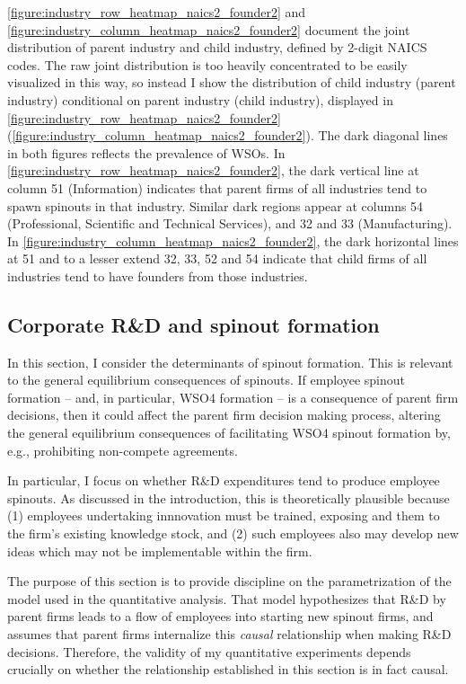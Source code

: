 \documentclass[11pt,english]{article}
\begin{document}
\autoref{figure:industry_row_heatmap_naics2_founder2} and \autoref{figure:industry_column_heatmap_naics2_founder2} document the joint distribution of parent industry and child industry, defined by 2-digit NAICS codes. The raw joint distribution is too heavily concentrated to be easily visualized in this way, so instead I show the distribution of child industry (parent industry) conditional on parent industry (child industry), displayed in \autoref{figure:industry_row_heatmap_naics2_founder2} (\autoref{figure:industry_column_heatmap_naics2_founder2}). The dark diagonal lines in both figures reflects the prevalence of WSOs. In \autoref{figure:industry_row_heatmap_naics2_founder2}, the dark vertical line at column 51 (Information) indicates that parent firms of all industries tend to spawn spinouts in that industry. Similar dark regions appear at columns 54 (Professional, Scientific and Technical Services), and 32 and 33 (Manufacturing). In \autoref{figure:industry_column_heatmap_naics2_founder2}, the dark horizontal lines at 51 and to a lesser extend 32, 33, 52 and 54 indicate that child firms of all industries tend to have founders from those industries.

\subsection{Corporate R\&D and spinout formation}\label{subsec:empirics:corpRDandspinouts}

In this section, I consider the determinants of spinout formation. This is relevant to the general equilibrium consequences of spinouts. If employee spinout formation -- and, in particular, WSO4 formation -- is a consequence of parent firm decisions, then it could affect the parent firm decision making process, altering the general equilibrium consequences of facilitating WSO4 spinout formation by, e.g., prohibiting non-compete agreements. 

In particular, I focus on whether R\&D expenditures tend to produce employee spinouts. As discussed in the introduction, this is theoretically plausible because (1) employees undertaking innnovation must be trained, exposing and them to the firm's existing knowledge stock, and (2) such employees also may develop new ideas which may not be implementable within the firm.  

The purpose of this section is to provide discipline on the parametrization of the model used in the quantitative analysis. That model hypothesizes that R\&D by parent firms leads to a flow of employees into starting new spinout firms, and assumes that parent firms internalize this \textit{causal} relationship when making R\&D decisions. Therefore, the validity of my quantitative experiments depends crucially on whether the relationship established in this section is in fact causal. 
\end{document}
